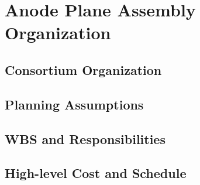 


\section{Anode Plane Assembly Organization}
\label{sec:fdsp-apa-org}

\subsection{Consortium Organization}
\label{sec:fdsp-apa-org-consortium}


\subsection{Planning Assumptions}
\label{sec:fdsp-apa-org-assmp}


\subsection{WBS and Responsibilities}
\label{sec:fdsp-apa-org-wbs}

\subsection{High-level Cost and Schedule}
\label{sec:fdsp-apa-org-cs}

















